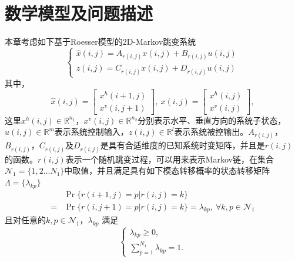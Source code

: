 \section{数学模型及问题描述}
	本章考虑如下基于Roesser模型的2D-Markov跳变系统
	\begin{equation} \label{qc-system-equation}
	\left\{
	\begin{array}{lr}
	\hat{x}(i,j) = A_{r(i,j)}x(i,j)+B_{r(i,j)}u(i,j) \\
	z(i,j) = C_{r(i,j)}x(i,j)+D_{r(i,j)}u(i,j)
	\end{array}
	\right.
	\end{equation}
	其中，
	\begin{equation*}
	\hat{x}(i,j) = \begin{bmatrix}
	x^{h}(i+1,j) \\
	x^{v}(i,j+1)
	\end{bmatrix}, \
	x(i, j) = \begin{bmatrix}
	x^{h}(i,j) \\
	x^{v}(i,j)
	\end{bmatrix},
	\end{equation*}
	这里$x^{h}(i,j)\in\mathbb{R}^{n_1}$，$x^{v}(i,j)\in\mathbb{R}^{n_2}$分别表示水平、垂直方向的系统子状态，$u(i,j)\in\mathbb{R}^{m}$表示系统控制输入，$z(i,j)\in\mathbb{R}^{l}$表示系统被控输出。$A_{r(i,j)}$，$B_{r(i,j)}$，$C_{r(i,j)}$及$D_{r(i,j)}$是具有合适维度的已知系统时变矩阵，并且是$r(i,j)$的函数。$r(i,j)$表示一个随机跳变过程，可以用来表示Markov链，在集合$\mathcal{N}_{1} = \{1,2...N_{1}\}$中取值，并且满足具有如下模态转移概率的状态转移矩阵$\varLambda = \{\lambda_{kp}\}$
	\begin{equation}\label{qc-tps-system}
	\begin{split}
	&\Pr\{r(i+1,j)=p|r(i,j)=k\}\\
	=&\Pr\{r(i,j+1)=p|r(i,j)=k\}=\lambda_{kp},\  \forall k,p \in \mathcal{N}_{1}
	\end{split}
	\end{equation}
	且对任意的$k, p\in\mathcal{N}_{1}$，$\lambda_{kp}$ 满足
	\begin{equation}
	\left\{
	\begin{array}{lr}
	\lambda_{kp} \geq 0, \\
	\sum_{p=1}^{N_1}\lambda_{kp}=1.
	\end{array}
	\right.
	\end{equation}
	
